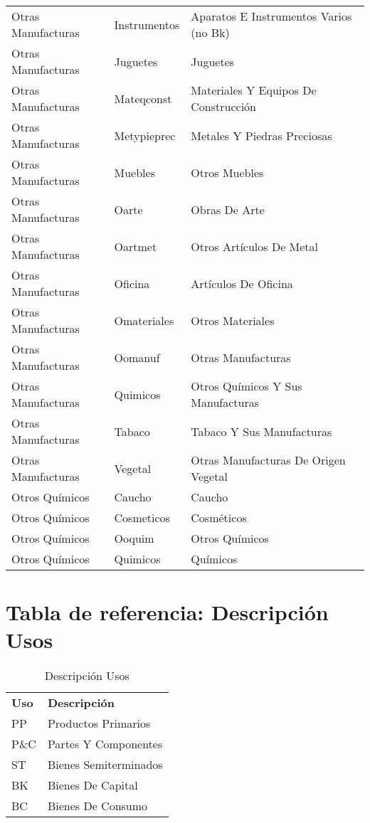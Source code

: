 \documentclass[class=article, crop=false]{standalone}
\begin{document}
\begin{longtable}[!ht]{lll}
	Otras Manufacturas & Instrumentos & Aparatos E Instrumentos Varios (no Bk) \\
	Otras Manufacturas & Juguetes & Juguetes \\
	Otras Manufacturas & Mateqconst & Materiales Y Equipos De Construcción \\
	Otras Manufacturas & Metypieprec & Metales Y Piedras Preciosas \\
	Otras Manufacturas & Muebles & Otros Muebles \\
	Otras Manufacturas & Oarte & Obras De Arte \\
	Otras Manufacturas & Oartmet & Otros Artículos De Metal \\
	Otras Manufacturas & Oficina & Artículos De Oficina \\
	Otras Manufacturas & Omateriales & Otros Materiales \\
	Otras Manufacturas & Oomanuf & Otras Manufacturas \\
	Otras Manufacturas & Quimicos & Otros Químicos Y Sus Manufacturas \\
	Otras Manufacturas & Tabaco & Tabaco Y Sus Manufacturas \\
	Otras Manufacturas & Vegetal & Otras Manufacturas De Origen Vegetal \\
	Otros Químicos & Caucho & Caucho \\
	Otros Químicos & Cosmeticos & Cosméticos \\
	Otros Químicos & Ooquim & Otros Químicos \\
	Otros Químicos & Quimicos & Químicos

\end{longtable}



\section{Tabla de referencia: Descripción Usos}


\begin{table}[!ht]
	\begin{tabular}{ll}
		\textbf{Uso} & \textbf{Descripción} \\
		PP & Productos Primarios \\
		P\&C & Partes Y Componentes \\
		ST & Bienes Semiterminados \\
		BK & Bienes De Capital \\
		BC & Bienes De Consumo
	\end{tabular}
\caption{Descripción Usos}
\label{tabla:usos}
\end{table}
\end{document}
